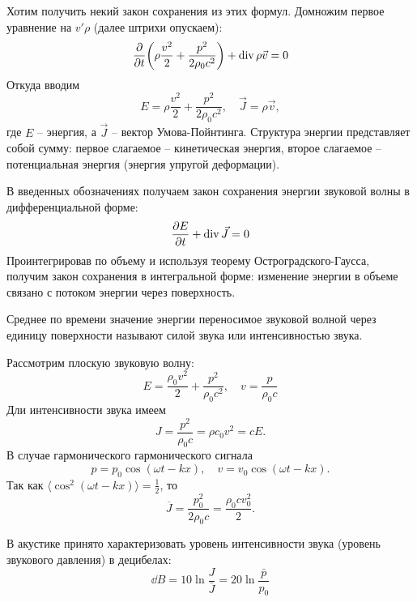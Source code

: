 Хотим получить некий закон сохранения из этих формул. Домножим первое 
уравнение на $v' \rho$ (далее штрихи опускаем):
\begin{equation}
    \pdv{t}\qty(
        \rho \frac{v^2}{2} + \frac{p^2}{2\rho_0 c^2})
 + \operatorname{div} \rho \vec{v} = 0
\end{equation}
Откуда вводим
\begin{equation}
    E = \rho \frac{v^2}{2} + \frac{p^2}{2\rho_0 c^2}, \quad
    \vec{J} = \rho \vec{v},
\end{equation}
где $E$ -- энергия, а $\vec{J}$ -- вектор Умова-Пойнтинга.
Структура энергии представляет собой сумму: первое слагаемое -- кинетическая энергия, второе слагаемое -- потенциальная энергия (энергия упругой деформации).

В введенных обозначениях получаем закон сохранения энергии звуковой волны в дифференциальной форме:
\begin{equation}
	\pdv{E}{t}+\operatorname{div} \vec{J}=0
\end{equation}
Проинтегрировав по объему и используя теорему Остроградского-Гаусса, получим закон сохранения в интегральной форме: изменение энергии в объеме связано с потоком энергии через поверхность.

Среднее по времени значение энергии переносимое звуковой волной через единицу поверхности называют силой звука или интенсивностью звука.

Рассмотрим плоскую звуковую волну:
\begin{equation}
    E = \frac{\rho_0 v^2}{2}+\frac{p^2}{\rho_0 c^2}, \quad v = \frac{p}{\rho_0 c}
\end{equation}
Дли интенсивности звука имеем
\begin{equation}
	J = \frac{p^2}{\rho_0 c} = \rho c_0 v^2 = cE.
\end{equation}
В случае гармонического гармонического сигнала
\begin{equation}
    p = p_0 \cos(\omega t - kx), \quad v=v_0 \cos(\omega t -kx).
\end{equation}
Так как $\langle\cos^2(\omega t - kx)\rangle=\frac12$, то
\begin{equation}
	\overline{J} = \frac{p_0^2}{2\rho_0 c} = \frac{\rho_0 c v_0^2}{2}.
\end{equation}


В акустике принято характеризовать уровень интенсивности звука (уровень звукового давления) в децибелах:
\begin{equation}
    \dd{B} = 10 \ln \frac{J}{\bar{J}} = 
    20 \ln \frac{\bar{p}}{p_0}
\end{equation}

